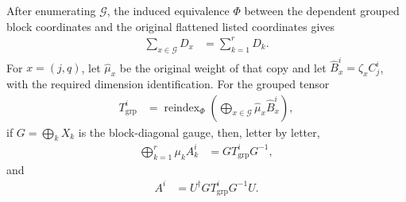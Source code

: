 \begin{lemma}
    After enumerating $\mathcal G$, the induced equivalence $\Phi$ between the
    dependent grouped block coordinates and the original flattened listed
    coordinates gives
    \begin{align}
        \sum_{x\in\mathcal G}D_x & =\sum_{k=1}^{r}D_k.
        \label{eq:cpsv_active_refinement_total_dim}
    \end{align}
    For $x=(j,q)$, let $\widehat\mu_x$ be the original weight of that copy and
    let $\widehat B_x^i=\zeta_xC_j^i$, with the required dimension
    identification. For the grouped tensor
    \begin{align}
        T_{\mathrm{grp}}^i
         & =\operatorname{reindex}_{\Phi}
        \left(\bigoplus_{x\in\mathcal G}
        \widehat\mu_x\widehat B_x^i\right),
        \label{eq:cpsv_active_refinement_grouped_tensor}
    \end{align}
    if $G=\bigoplus_kX_k$ is the block-diagonal gauge, then, letter by letter,
    \begin{align}
        \bigoplus_{k=1}^{r}\mu_kA_k^i
         & =GT_{\mathrm{grp}}^iG^{-1},
        \label{eq:cpsv_active_refinement_regroup}
    \end{align}
    and
    \begin{align}
        A^i & =U^\dagger GT_{\mathrm{grp}}^iG^{-1}U.
        \label{eq:cpsv_active_refinement_reconstruction}
    \end{align}
\end{lemma}

